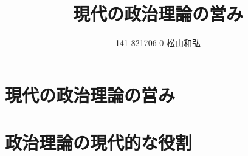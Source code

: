 \documentclass{jsarticle}
\begin{document}
\title{現代の政治理論の営み}
\author{141-821706-0 松山和弘}
\maketitle

\section{現代の政治理論の営み}


\section{政治理論の現代的な役割}
\end{document}
